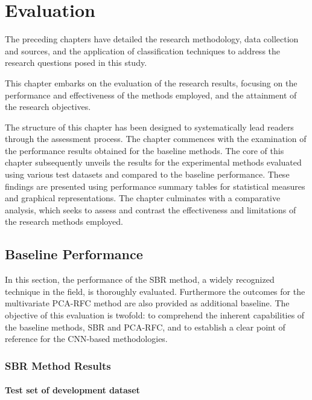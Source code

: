 \section{Evaluation}
\label{sec:evaluation}

The preceding chapters have detailed the research methodology, data collection and sources, and the application of classification techniques 
to address the research questions posed in this study. 

This chapter embarks on the evaluation of the research results, focusing on the performance and effectiveness of the methods employed, 
and the attainment of the research objectives.

The structure of this chapter has been designed to systematically lead readers through the assessment process. 
The chapter commences with the examination of the performance results obtained for the baseline methods.
The core of this chapter subsequently unveils the results 
for the experimental methods evaluated using various test datasets and compared to the baseline performance.
These findings are presented using performance summary tables for statistical measures and graphical representations.
The chapter culminates with a comparative analysis, which seeks to assess and contrast the effectiveness and 
limitations of the research methods employed.

\subsection{Baseline Performance}
\label{subsec:baseline_performance}

In this section, the performance of the SBR method, a widely recognized technique in the field, 
is thoroughly evaluated. 
Furthermore the outcomes for the multivariate PCA-RFC method are also provided as additional baseline.
The objective of this evaluation is twofold: to comprehend the inherent capabilities of the baseline methods, SBR and
PCA-RFC, and to establish a clear point of reference for the CNN-based methodologies.

\subsubsection{SBR Method Results}
\label{subsubsec:eval_sbr}


\paragraph{Test set of development dataset}

